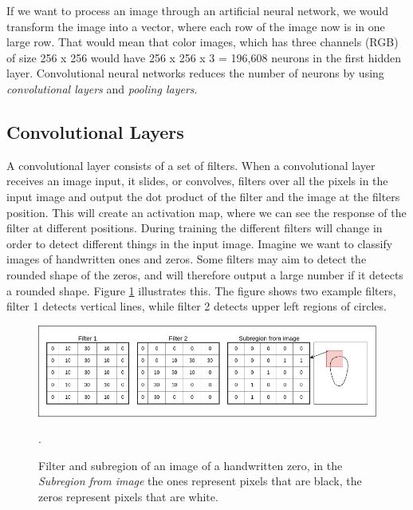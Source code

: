 \vspace{2mm}

If we want to process an image through an artificial neural network, we would transform the image into a vector, where each row of the image now is in one large row. That would mean that color images, which has three channels (RGB) of size 256 x 256 would have 256 x 256 x 3 = 196,608 neurons in the first hidden layer. Convolutional neural networks reduces the number of neurons by using \textit{convolutional layers} and \textit{pooling layers}.

\subsection{Convolutional Layers}
\label{sec:conv}
 A convolutional layer consists of a set of filters. When a convolutional layer receives an image input, it slides, or convolves, filters over all the pixels in the input image and output the dot product of the filter and the image at the filters position. This will create an activation map, where we can see the response of the filter at different positions. During training the different filters will change in order to detect different things in the input image. Imagine we want to classify images of handwritten ones and zeros. Some filters may aim to detect the rounded shape of the zeros, and will therefore output a large number if it detects a rounded shape. Figure \ref{fig:filter_cnn} illustrates this. The figure shows two example filters, filter 1 detects vertical lines, while filter 2 detects upper left regions of circles. 

\begin{figure}[h!]
    \centering
    \includegraphics[scale=0.40]{fig/Filter_cnn.png}
    \caption{Filter and subregion of an image of a handwritten zero, in the \textit{Subregion from image} the ones represent pixels that are black, the zeros represent pixels that are white.}
    \label{fig:filter_cnn}.
\end{figure}

\newpage

